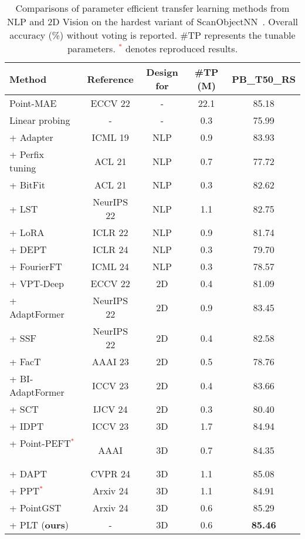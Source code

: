 \begin{table}[!t]
\scriptsize
\setlength{\tabcolsep}{1.8mm}
\centering
\caption{Comparisons of parameter efficient transfer learning methods from NLP and 2D Vision on the hardest variant of ScanObjectNN~\cite{uy2019revisiting}. Overall accuracy (\%) without voting is reported. \#TP represents the tunable parameters. \textcolor{red}{$^*$} denotes reproduced results.}
  \vspace{-10pt}
\label{tab:compare}
\begin{tabular}{ lcccc }
\toprule
 Method &Reference& Design for &\#TP (M) & PB\_T50\_RS \\
\midrule
 Point-MAE~\cite{pang2022masked}  &ECCV 22 & - & 22.1 & 85.18  \\
 Linear probing &- & - & 0.3& 75.99\\
 \midrule
  + Adapter~\cite{houlsby2019parameter}&ICML 19 & NLP & 0.9 & 83.93 \\
  + Perfix tuning~\cite{li2021prefix}& ACL 21 & NLP &0.7 & 77.72  \\
  + BitFit~\cite{zaken2022bitfit} & ACL 21 & NLP &0.3 & 82.62    \\
  + LST~\cite{sung2022lst} & NeurIPS 22 & NLP & 1.1 & 82.75\\
  + LoRA~\cite{hu2021lora} & ICLR 22 & NLP & 0.9&  81.74   \\
  + DEPT~\cite{shi2024dept} & ICLR 24 & NLP & 0.3 & 79.70\\
  + FourierFT~\cite{Gao2024Fourier} & ICML 24 & NLP &0.3 & 78.57\\
  \midrule
  + VPT-Deep~\cite{jia2022visual}&ECCV 22 & 2D &0.4 &  81.09 \\
  + AdaptFormer~\cite{chen2022adaptformer} &NeurIPS 22 & 2D &0.9  & 83.45 \\
  + SSF~\cite{lian2022scaling} & NeurIPS 22 & 2D &0.4  & 82.58\\
  + FacT~\cite{jie2023fact} & AAAI 23 & 2D & 0.5 & 78.76\\
  + BI-AdaptFormer~\cite{jie2023revisiting} & ICCV 23 & 2D & 0.4 & 83.66\\
  + SCT~\cite{zhao2024sct} & IJCV 24 & 2D & 0.3 & 80.40\\
  \midrule
  + IDPT~\cite{zha2023instance} &ICCV 23 & 3D & 1.7 &84.94\\
  + Point-PEFT\textcolor{red}{$^*$}~\cite{tang2024point} & AAAI & 3D & 0.7 &84.35\\
  + DAPT~\cite{zhou2024dynamic} & CVPR 24 & 3D & 1.1 & 85.08 \\
  + PPT\textcolor{red}{$^*$}~\cite{zhang2024positional} & Arxiv 24 & 3D & 1.1 & 84.91\\
  + PointGST~\cite{liang2024parameter} & Arxiv 24 & 3D & 0.6 & 85.29\\
  \rowcolor{linecolor!40}+ PLT (\textbf{ours}) & - & 3D & 0.6 & \textbf{85.46} \\
\bottomrule
\end{tabular}
\end{table}
